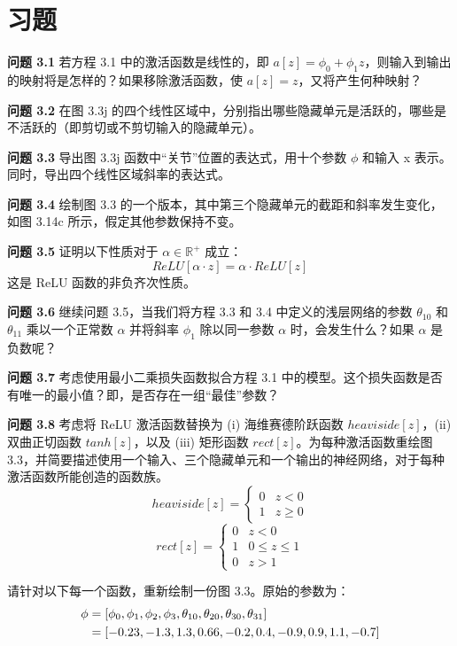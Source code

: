 \section{习题}
\textbf{问题 3.1} 若方程 3.1 中的激活函数是线性的，即 \(a[z] = \phi_0 + \phi_{1}z\)，则输入到输出的映射将是怎样的？如果移除激活函数，使 \(a[z] = z\)，又将产生何种映射？

\textbf{问题 3.2} 在图 3.3j 的四个线性区域中，分别指出哪些隐藏单元是活跃的，哪些是不活跃的（即剪切或不剪切输入的隐藏单元）。

\textbf{问题 3.3} 导出图 3.3j 函数中“关节”位置的表达式，用十个参数 \(\phi\) 和输入 x 表示。同时，导出四个线性区域斜率的表达式。

\textbf{问题 3.4} 绘制图 3.3 的一个版本，其中第三个隐藏单元的截距和斜率发生变化，如图 3.14c 所示，假定其他参数保持不变。


\textbf{问题 3.5} 证明以下性质对于 \(\alpha \in \mathbb{R}^+\) 成立：
\begin{equation}
ReLU[\alpha \cdot z] = \alpha \cdot ReLU[z] 
\end{equation}
这是 ReLU 函数的非负齐次性质。

\textbf{问题 3.6} 继续问题 3.5，当我们将方程 3.3 和 3.4 中定义的浅层网络的参数 \(\theta_{10}\) 和 \(\theta_{11}\) 乘以一个正常数 \(\alpha\) 并将斜率 \(\phi_1\) 除以同一参数 \(\alpha\) 时，会发生什么？如果 \(\alpha\) 是负数呢？

\textbf{问题 3.7} 考虑使用最小二乘损失函数拟合方程 3.1 中的模型。这个损失函数是否有唯一的最小值？即，是否存在一组“最佳”参数？

\textbf{问题 3.8} 考虑将 ReLU 激活函数替换为 (i) 海维赛德阶跃函数 \(heaviside[z]\)，(ii) 双曲正切函数 \(tanh[z]\)，以及 (iii) 矩形函数 \(rect[z]\)。为每种激活函数重绘图 3.3，并简要描述使用一个输入、三个隐藏单元和一个输出的神经网络，对于每种激活函数所能创造的函数族。
\begin{equation}
heaviside[z] = \begin{cases}
	0 & z < 0 \\
	1 & z \geq 0
\end{cases}
\end{equation}
\begin{equation}
rect[z] = \begin{cases}
	0 & z < 0 \\
	1 & 0 \leq z \leq 1 \\
	0 & z > 1
\end{cases} 
\end{equation}

请针对以下每一个函数，重新绘制一份图 3.3。原始的参数为：
\begin{align}
	\phi &= [\phi_0, \phi_1, \phi_2, \phi_3, \theta_{10}, \theta_{20}, 	\theta_{30}, 	\theta_{31}] \notag \\
	&= [-0.23, -1.3, 1.3, 0.66, -0.2, 0.4, -0.9, 0.9, 1.1, -0.7]
\end{align}

